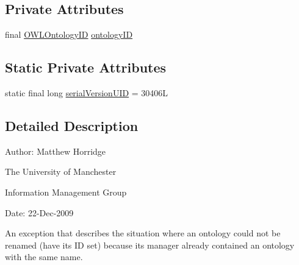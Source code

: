 \subsection*{Private Attributes}
\begin{DoxyCompactItemize}
\item 
final \hyperlink{classorg_1_1semanticweb_1_1owlapi_1_1model_1_1_o_w_l_ontology_i_d}{O\-W\-L\-Ontology\-I\-D} \hyperlink{classorg_1_1semanticweb_1_1owlapi_1_1model_1_1_o_w_l_ontology_rename_exception_a0666e4a70846bee5270435f6c508cb9d}{ontology\-I\-D}
\end{DoxyCompactItemize}
\subsection*{Static Private Attributes}
\begin{DoxyCompactItemize}
\item 
static final long \hyperlink{classorg_1_1semanticweb_1_1owlapi_1_1model_1_1_o_w_l_ontology_rename_exception_a7e2449f5883352ae1026eda7ff01d360}{serial\-Version\-U\-I\-D} = 30406\-L
\end{DoxyCompactItemize}


\subsection{Detailed Description}
Author\-: Matthew Horridge\par
 The University of Manchester\par
 Information Management Group\par
 Date\-: 22-\/\-Dec-\/2009 

An exception that describes the situation where an ontology could not be renamed (have its I\-D set) because its manager already contained an ontology with the same name. 


